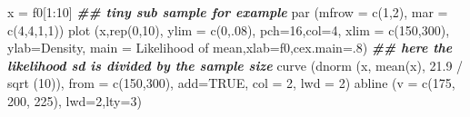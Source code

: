 \documentclass[
]{book}
\newenvironment{Shaded}{\begin{snugshade}}{\end{snugshade}}
\newcommand{\AttributeTok}[1]{\textcolor[rgb]{0.77,0.63,0.00}{#1}}
\newcommand{\ConstantTok}[1]{\textcolor[rgb]{0.00,0.00,0.00}{#1}}
\newcommand{\DecValTok}[1]{\textcolor[rgb]{0.00,0.00,0.81}{#1}}
\newcommand{\DocumentationTok}[1]{\textcolor[rgb]{0.56,0.35,0.01}{\textbf{\textit{#1}}}}
\newcommand{\FloatTok}[1]{\textcolor[rgb]{0.00,0.00,0.81}{#1}}
\newcommand{\FunctionTok}[1]{\textcolor[rgb]{0.00,0.00,0.00}{#1}}
\newcommand{\NormalTok}[1]{#1}
\newcommand{\OtherTok}[1]{\textcolor[rgb]{0.56,0.35,0.01}{#1}}
\newcommand{\SpecialCharTok}[1]{\textcolor[rgb]{0.00,0.00,0.00}{#1}}
\newcommand{\StringTok}[1]{\textcolor[rgb]{0.31,0.60,0.02}{#1}}
\begin{document}
\begin{Shaded}
\begin{Highlighting}[]
\NormalTok{x }\OtherTok{=}\NormalTok{ f0[}\DecValTok{1}\SpecialCharTok{:}\DecValTok{10}\NormalTok{]   }\DocumentationTok{\#\# tiny sub sample for example}
\FunctionTok{par}\NormalTok{ (}\AttributeTok{mfrow =} \FunctionTok{c}\NormalTok{(}\DecValTok{1}\NormalTok{,}\DecValTok{2}\NormalTok{), }\AttributeTok{mar =} \FunctionTok{c}\NormalTok{(}\DecValTok{4}\NormalTok{,}\DecValTok{4}\NormalTok{,}\DecValTok{1}\NormalTok{,}\DecValTok{1}\NormalTok{))}
\FunctionTok{plot}\NormalTok{ (x,}\FunctionTok{rep}\NormalTok{(}\DecValTok{0}\NormalTok{,}\DecValTok{10}\NormalTok{), }\AttributeTok{ylim =} \FunctionTok{c}\NormalTok{(}\DecValTok{0}\NormalTok{,.}\DecValTok{08}\NormalTok{), }\AttributeTok{pch=}\DecValTok{16}\NormalTok{,}\AttributeTok{col=}\DecValTok{4}\NormalTok{, }\AttributeTok{xlim =} \FunctionTok{c}\NormalTok{(}\DecValTok{150}\NormalTok{,}\DecValTok{300}\NormalTok{), }
      \AttributeTok{ylab=}\StringTok{\textquotesingle{}Density\textquotesingle{}}\NormalTok{, }\AttributeTok{main =} \StringTok{\textquotesingle{}Likelihood of mean\textquotesingle{}}\NormalTok{,}\AttributeTok{xlab=}\StringTok{\textquotesingle{}f0\textquotesingle{}}\NormalTok{,}\AttributeTok{cex.main=}\NormalTok{.}\DecValTok{8}\NormalTok{)}
\DocumentationTok{\#\# here the likelihood sd is divided by the sample size}
\FunctionTok{curve}\NormalTok{ (}\FunctionTok{dnorm}\NormalTok{ (x, }\FunctionTok{mean}\NormalTok{(x), }\FloatTok{21.9} \SpecialCharTok{/} \FunctionTok{sqrt}\NormalTok{ (}\DecValTok{10}\NormalTok{)), }\AttributeTok{from =} \FunctionTok{c}\NormalTok{(}\DecValTok{150}\NormalTok{,}\DecValTok{300}\NormalTok{), }
       \AttributeTok{add=}\ConstantTok{TRUE}\NormalTok{, }\AttributeTok{col =} \DecValTok{2}\NormalTok{, }\AttributeTok{lwd =} \DecValTok{2}\NormalTok{)}
\FunctionTok{abline}\NormalTok{ (}\AttributeTok{v =} \FunctionTok{c}\NormalTok{(}\DecValTok{175}\NormalTok{, }\DecValTok{200}\NormalTok{, }\DecValTok{225}\NormalTok{), }\AttributeTok{lwd=}\DecValTok{2}\NormalTok{,}\AttributeTok{lty=}\DecValTok{3}\NormalTok{)}


\end{Highlighting}
\end{Shaded}
\end{document}

